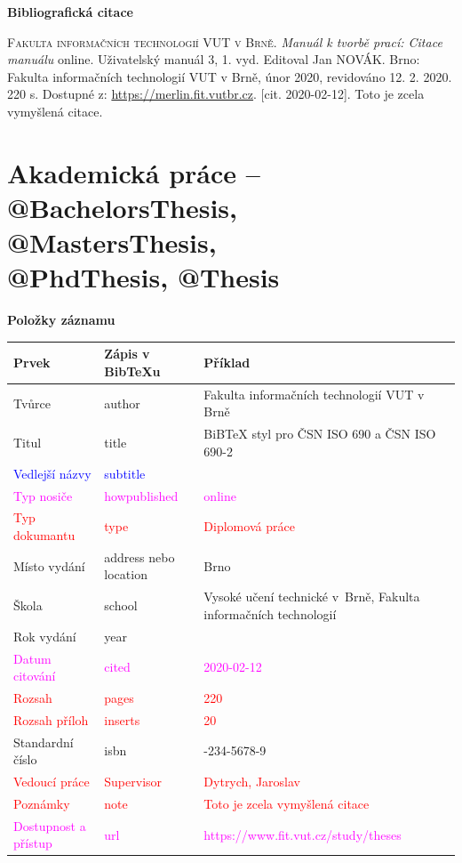 \bigskip

\noindent \textbf{Bibliografická citace}

\medskip

\noindent \textsc{Fakulta informačních technologií VUT v Brně}. \textit{Manuál k tvorbě prací: Citace manuálu} online. Uživatelský manuál 3, 1. vyd. Editoval Jan NOVÁK.
Brno: Fakulta informačních technologií VUT v Brně, únor 2020, revidováno 12. 2. 2020. 220 s. Dostupné z: \url{https://merlin.fit.vutbr.cz}. [cit. 2020-02-12]. Toto je zcela vymyšlená citace.
\newpage
\section*{Akademická práce -- @BachelorsThesis, @MastersThesis, \\@PhdThesis, @Thesis}
\label{pr-thesis}
\noindent \textbf{Položky záznamu}

\medskip

\begin{tabularx}{0.95\linewidth}{X X >{\raggedright\arraybackslash}X}
    Prvek & Zápis v BibTeXu & Příklad\\\hline
    Tvůrce & author & Fakulta informačních technologií VUT v Brně\\
    Titul & title & BiBTeX styl pro ČSN ISO 690 a ČSN ISO 690-2\\
    \textcolor{blue}{Vedlejší názvy} & \textcolor{blue}{subtitle} & \\
    \textcolor{magenta}{Typ nosiče} & \textcolor{magenta}{howpublished} & \textcolor{magenta}{online}\\
    \textcolor{red}{Typ dokumantu} & \textcolor{red}{type} & \textcolor{red}{Diplomová práce}\\
    Místo vydání & address nebo location & Brno\\
    Škola & school & Vysoké učení technické v~Brně, Fakulta informačních technologií\\
    Rok vydání & year & 2020\\
    \textcolor{magenta}{Datum citování} & \textcolor{magenta}{cited} & \textcolor{magenta}{2020-02-12}\\
    \textcolor{red}{Rozsah} & \textcolor{red}{pages} & \textcolor{red}{220}\\
    \textcolor{red}{Rozsah příloh} & \textcolor{red}{inserts} & \textcolor{red}{20}\\
    Standardní číslo & isbn & 01-234-5678-9\\
    \textcolor{red}{Vedoucí práce} & \textcolor{red}{Supervisor} & \textcolor{red}{Dytrych, Jaroslav}\\
    \textcolor{red}{Poznámky} & \textcolor{red}{note} & \textcolor{red}{Toto je zcela vymyšlená citace}\\
    \textcolor{magenta}{Dostupnost a přístup} & \textcolor{magenta}{url} & \textcolor{magenta}{https://www.fit.vut.cz/\-study/theses}\\
\end{tabularx}

